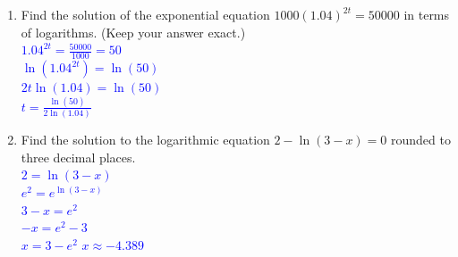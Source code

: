 \documentclass{ximera}
\begin{document}
\begin{exercise}
    \begin{enumerate}
        \item Find the solution of the exponential equation $1000(1.04)^{2t}=50000$ in terms of logarithms. (Keep your answer exact.)\\
        \textcolor{blue}{$1.04^{2t}=\frac{50000}{1000}=50$\\
        $\ln(1.04^{2t})=\ln(50)$\\
        $2t\ln(1.04)=\ln(50)$\\
        $t=\frac{\ln(50)}{2\ln(1.04)}$}
        \item Find the solution to the logarithmic equation $2-\ln(3-x)=0$ rounded to three decimal places.\\
        \textcolor{blue}{$2=\ln(3-x)$\\
        $e^{2}=e^{\ln(3-x)}$\\
        $3-x=e^{2}$\\
        $-x=e^{2}-3$\\
        $x=3-e^{2}$
        $x\approx -4.389$}
    \end{enumerate}
    
\end{exercise}
\end{document}
